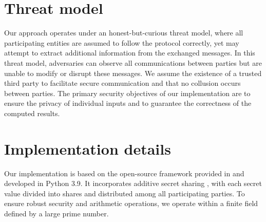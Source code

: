 \documentclass[10pt,conference,compsocconf]{IEEEtran}
\begin{document}



\section{Threat model}

Our approach operates under an honest-but-curious threat model, where all participating entities are assumed to follow the protocol correctly, yet may attempt to extract additional information from the exchanged messages. In this threat model, adversaries can observe all communications between parties but are unable to modify or disrupt these messages. We assume the existence of a trusted third party to facilitate secure communication and that no collusion occurs between parties. The primary security objectives of our implementation are to ensure the privacy of individual inputs and to guarantee the correctness of the computed results. 

\section{Implementation details}
Our implementation is based on the open-source framework provided in \cite{git} and developed in Python 3.9. It incorporates additive secret sharing , with each secret value divided into shares and distributed among all participating parties. To ensure robust security and arithmetic operations, we operate within a finite field defined by a large prime number. 
\end{document}
